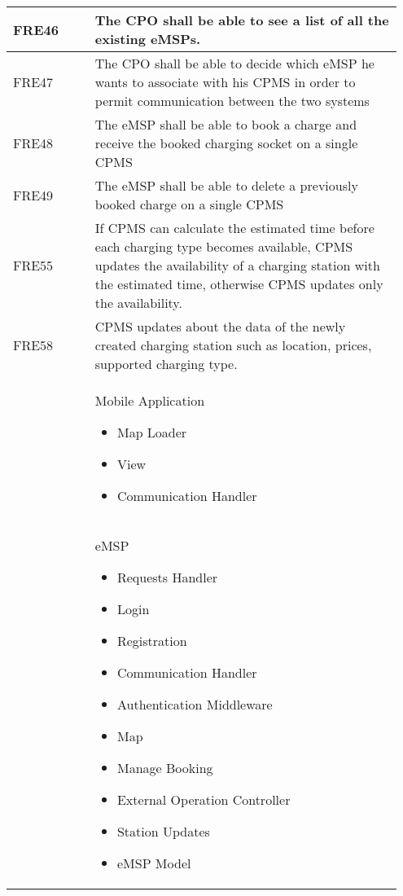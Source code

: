 {\begin{longtable}{|p{0.20\linewidth}p{0.75\linewidth}|}
    \hline
    \rowcolor{bluepoli!15}
    FRE46 & The CPO shall be able to see a list of all the existing eMSPs. \\
    \hline
    \rowcolor{bluepoli!15} FRE47 &  The CPO shall be able to decide which eMSP he wants to associate with his CPMS in order to permit communication between the two systems \\
    \hline
    \rowcolor{bluepoli!15} FRE48 & The eMSP shall be able to book a charge and receive the booked charging socket on a single CPMS \\
    \hline
    \rowcolor{bluepoli!15} FRE49 & The eMSP shall be able to delete a previously booked charge on a single CPMS\\
    \hline
    \rowcolor{bluepoli!15} FRE55 & If CPMS can calculate the estimated time before each charging type becomes available, CPMS updates the availability of a charging station with the estimated time, otherwise CPMS updates only the availability. \\
    \hline
    \rowcolor{bluepoli!15} FRE58 & CPMS updates about the data of the newly created charging station such as location, prices, supported charging type. \\
    \hline
    \rowcolor{bluepoli!5}  & Mobile Application  \newline
    \begin{itemize}
        \item Map Loader
        \item View
        \item Communication Handler
    \end{itemize} \\
    \hline
    \rowcolor{bluepoli!5}  & eMSP  \newline
    \begin{itemize}
        \item Requests Handler
        \item Login
        \item Registration
        \item Communication
        Handler
        \item Authentication Middleware
        \item Map
        \item Manage Booking
        \item External Operation Controller
        \item Station Updates
        \item eMSP Model
    \end{itemize} \\

\end{longtable}}
